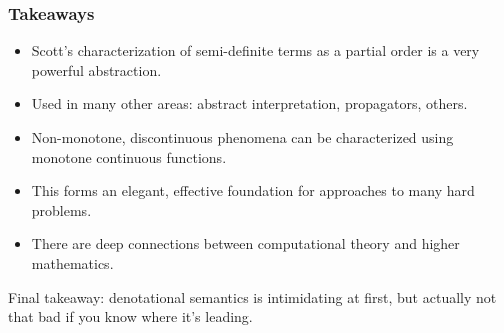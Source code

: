 \documentclass{beamer}
\begin{document}
\begin{frame}
  \frametitle{Takeaways}
  \begin{itemize}
    \item Scott's characterization of semi-definite terms as a partial
      order is a very powerful abstraction.
    \item Used in many other areas: abstract interpretation,
      propagators, others.
    \item Non-monotone, discontinuous phenomena can be characterized
      using monotone continuous functions.
    \item This forms an elegant, effective foundation for approaches
      to many hard problems.
    \item There are deep connections between computational theory and
      higher mathematics.
  \end{itemize}
  Final takeaway: denotational semantics is intimidating at first, but
  actually not that bad if you know where it's leading.
\end{frame}
\end{document}
